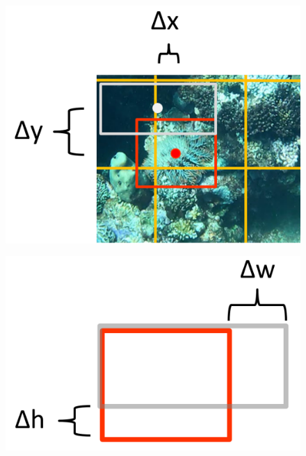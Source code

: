 \documentclass[landscape,a2,final,12pt]{issposter}
\begin{document}
\begin{multicols}{3}
\begin{samepage}
\begin{small}
            \begin{figure}
                \centering
                \begin{minipage}[b]{.5\textwidth}
                \centering
                \includegraphics[width=.6\linewidth]{5_loss_center.png}
                \label{fig:test1}
                \end{minipage}%
                \begin{minipage}[b]{.5\textwidth}
                \centering
                \includegraphics[width=.6\linewidth]{5_loss_size.png}
                \label{fig:test2}
                \end{minipage}
                \end{figure}
            

            \end{small}
    \end{samepage}
    \columnbreak
    \begin{samepage}

\end{samepage}
\end{multicols}
\end{document}
